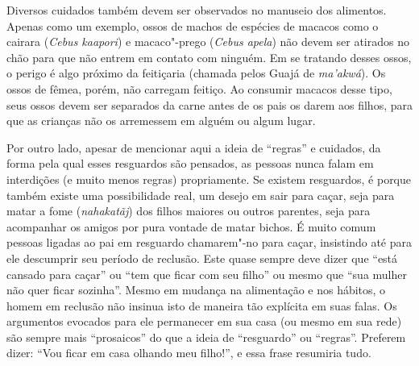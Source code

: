 Diversos cuidados também devem ser observados no manuseio dos alimentos.
Apenas como um exemplo, ossos de machos de espécies de macacos como o
cairara (\emph{Cebus kaapori}) e macaco"-prego (\emph{Cebus apela}) não
devem ser atirados no chão para que não entrem em contato com ninguém.
Em se tratando desses ossos, o perigo é algo próximo da feitiçaria
(chamada pelos Guajá de \emph{ma'akwá}). Os ossos de fêmea, porém, não
carregam feitiço. Ao consumir macacos desse tipo, seus ossos devem ser
separados da carne antes de os pais os darem aos filhos, para que as
crianças não os arremessem em alguém ou algum lugar.

Por outro lado, apesar de mencionar aqui a ideia de ``regras'' e
cuidados, da forma pela qual esses resguardos são pensados, as pessoas
nunca falam em interdições (e muito menos regras) propriamente. Se
existem resguardos, é porque também existe uma possibilidade real, um
desejo em sair para caçar, seja para matar a fome (\emph{nahakatãj}) dos
filhos maiores ou outros parentes, seja para acompanhar os amigos por
pura vontade de matar bichos. É muito comum pessoas ligadas ao pai em
resguardo chamarem"-no para caçar, insistindo até para ele descumprir seu
período de reclusão. Este quase sempre deve dizer que ``está cansado para
caçar'' ou ``tem que ficar com seu filho'' ou mesmo que ``sua mulher não
quer ficar sozinha''. Mesmo em mudança na alimentação e nos hábitos, o
homem em reclusão não insinua isto de maneira tão explícita em suas
falas. Os argumentos evocados para ele permanecer em sua casa (ou mesmo
em sua rede) são sempre mais ``prosaicos'' do que a ideia de ``resguardo''
ou ``regras''. Preferem dizer: ``Vou ficar em casa olhando meu filho!'', e
essa frase resumiria tudo.

